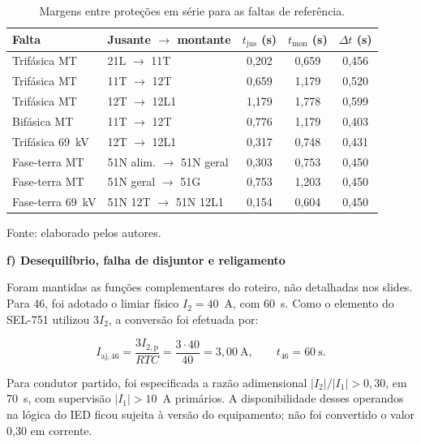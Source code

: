 \begin{table}[htbp]
    \centering
    \caption{Margens entre proteções em série para as faltas de referência.}
    \label{tab:oc_margens}
    \begin{tabular}{llccc}
        \hline
        \textbf{Falta} & \textbf{Jusante $\rightarrow$ montante} & \textbf{$t_{\mathrm{jus}}$ (s)} & \textbf{$t_{\mathrm{mon}}$ (s)} & \textbf{$\Delta t$ (s)}\\
        \hline
        Trifásica MT & 21L $\rightarrow$ 11T & 0,202 & 0,659 & 0,456\\
        Trifásica MT & 11T $\rightarrow$ 12T & 0,659 & 1,179 & 0,520\\
        Trifásica MT & 12T $\rightarrow$ 12L1 & 1,179 & 1,778 & 0,599\\
        Bifásica MT & 11T $\rightarrow$ 12T & 0,776 & 1,179 & 0,403\\
        Trifásica 69~kV & 12T $\rightarrow$ 12L1 & 0,317 & 0,748 & 0,431\\
        Fase-terra MT & 51N alim. $\rightarrow$ 51N geral & 0,303 & 0,753 & 0,450\\
        Fase-terra MT & 51N geral $\rightarrow$ 51G & 0,753 & 1,203 & 0,450\\
        Fase-terra 69~kV & 51N 12T $\rightarrow$ 51N 12L1 & 0,154 & 0,604 & 0,450\\
        \hline
    \end{tabular}
    \par\vspace{2pt}
    {\small Fonte: elaborado pelos autores.}
\end{table}

\textbf{f) Desequilíbrio, falha de disjuntor e religamento}

Foram mantidas as funções complementares do roteiro, não detalhadas nos slides. Para 46, foi adotado o limiar físico $I_2=40$~A, com 60~s. Como o elemento do SEL-751 utilizou $3I_2$, a conversão foi efetuada por:

\begin{equation}
    I_{\mathrm{aj},46}=\frac{3I_{2,\mathrm{p}}}{RTC}
    =\frac{3\cdot40}{40}=3{,}00~\mathrm{A},
    \qquad t_{46}=60~\mathrm{s}.
    \label{eq:oc_46}
\end{equation}

Para condutor partido, foi especificada a razão adimensional $|I_2|/|I_1|>0{,}30$, em 70~s, com supervisão $|I_1|>10$~A primários. A disponibilidade desses operandos na lógica do IED ficou sujeita à versão do equipamento; não foi convertido o valor 0,30 em corrente.

